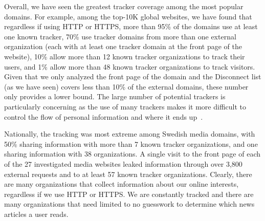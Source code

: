 \documentclass[letterpaper]{sig-alternate-10pt}
\begin{document}
Overall, we have seen the greatest tracker coverage among the most popular domains.
For example, among the top-10K global websites, 
we have found that regardless if using HTTP or HTTPS,
more than 95\% of the domains use at least one known tracker,
70\% use tracker domains from more than one external organization 
(each with at least one tracker domain at the front page of the website),
10\% allow more than 12 known tracker organizations to track their users, 
and 1\% allow more than 48 known tracker organizations to track visitors.
Given that we only analyzed the front page of the domain and the Disconnect list
(as we have seen) covers less than 10\% of the external domains,
these number only provides a lower bound. 
The large number of potential trackers is particularly concerning as 
the use of many trackers makes it more difficult to control the flow of
personal information and where it ends up~\cite{SmDX11}.

Nationally, the tracking was most extreme among Swedish media domains,
with 50\% sharing information with more than 7 known tracker organizations, 
and one sharing information with 38 organizations.
A single visit to the front page of each of the 27 investigated media websites
leaked information through over 3,800 external requests and to at least 57 known tracker organizations.
Clearly, 
there are many organizations that collect information about our online interests,
regardless if we use HTTP or HTTPS.
We are constantly tracked and
there are many organizations that need limited to no guesswork 
to determine which news articles a user reads.
\end{document}
